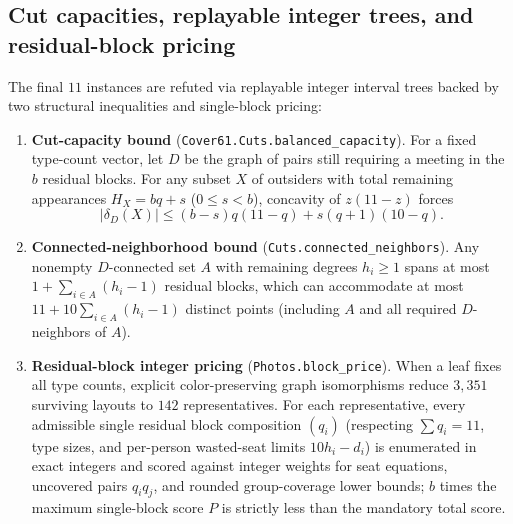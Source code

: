 \documentclass[11pt,a4paper]{article}
\theoremstyle{definition}
\theoremstyle{remark}
\begin{document}
\subsection{Cut capacities, replayable integer trees, and residual-block pricing}

The final $11$ instances are refuted via replayable integer interval trees backed by two structural inequalities and single-block pricing:
\begin{enumerate}
  \item \textbf{Cut-capacity bound} (\texttt{Cover61.Cuts.balanced\_capacity}). For a fixed type-count vector, let $D$ be the graph of pairs still requiring a meeting in the $b$ residual blocks. For any subset $X$ of outsiders with total remaining appearances $H_X = bq + s$ ($0 \le s < b$), concavity of $z(11-z)$ forces
  \begin{equation}\label{eq:cut}
    |\delta_D(X)| \le (b - s)q(11 - q) + s(q + 1)(10 - q).
  \end{equation}
  \item \textbf{Connected-neighborhood bound} (\texttt{Cuts.connected\_neighbors}). Any nonempty $D$-connected set $A$ with remaining degrees $h_i \ge 1$ spans at most $1 + \sum_{i \in A}(h_i - 1)$ residual blocks, which can accommodate at most $11 + 10\sum_{i \in A}(h_i - 1)$ distinct points (including $A$ and all required $D$-neighbors of $A$).
  \item \textbf{Residual-block integer pricing} (\texttt{Photos.block\_price}). When a leaf fixes all type counts, explicit color-preserving graph isomorphisms reduce $3{,}351$ surviving layouts to $142$ representatives. For each representative, every admissible single residual block composition $(q_i)$ (respecting $\sum q_i = 11$, type sizes, and per-person wasted-seat limits $10h_i - d_i$) is enumerated in exact integers and scored against integer weights for seat equations, uncovered pairs $q_i q_j$, and rounded group-coverage lower bounds; $b$ times the maximum single-block score $P$ is strictly less than the mandatory total score.
\end{enumerate}
\end{document}
